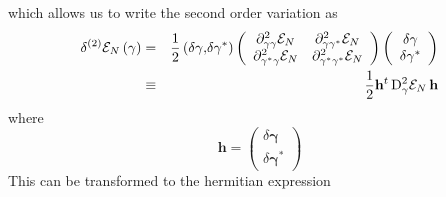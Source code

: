 \documentclass[aps,preprint]{revtex4}
\begin{document}
which allows us to write the second order variation as 
\begin{eqnarray}
\delta ^{(2)}\mathcal{E}_{N}\left( \mathbf{\gamma }\right) &=&\frac{1}{2}%
\left( \delta \mathbf{\gamma ,}\delta \mathbf{\gamma }^{\ast }\right) \left( 
\begin{array}{cc}
\mathrm{\partial }_{\gamma \gamma }^{2}\mathcal{E}_{N} & \mathrm{\partial }%
_{\gamma \gamma ^{\ast }}^{2}\mathcal{E}_{N} \\ 
\mathrm{\partial }_{\gamma ^{\ast }\gamma }^{2}\mathcal{E}_{N} & \mathrm{%
\partial }_{\gamma ^{\ast }\gamma ^{\ast }}^{2}\mathcal{E}_{N}%
\end{array}%
\right) \left( 
\begin{array}{c}
\delta \mathbf{\gamma } \\ 
\delta \mathbf{\gamma }^{\ast }%
\end{array}%
\right)  \nonumber \\
&\equiv &\frac{1}{2}\mathbf{h}^{t}\,\mathrm{D}_{\gamma }^{2}\mathcal{E}_{N}\,%
\mathbf{h}
\end{eqnarray}%
where 
\begin{equation}
\mathbf{h=}\left( 
\begin{array}{c}
\delta \mathbf{\gamma } \\ 
\delta \mathbf{\gamma }^{\ast }%
\end{array}%
\right)
\end{equation}%
This can be transformed to the hermitian expression 
\end{document}
